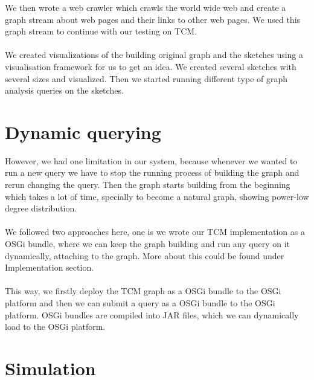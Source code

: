 \documentclass[12pt]{report}
\numberwithin{figure}{section}
\numberwithin{table}{section}
\begin{document}
We then wrote a web crawler which crawls the world wide web and create a graph stream about web pages and their links to other web pages. We used this graph stream to continue with our testing on TCM. 

\paragraph{}

We created visualizations of the building original graph and the sketches using a visualisation framework for us to get an idea. We created several sketches with several sizes and visualized. Then we started running different type of graph analysis queries on the sketches. 

\section{Dynamic querying}

However, we had one limitation in our system, because whenever we wanted to run a new query we have to stop the running process of building the graph and rerun changing the query. Then the graph starts building from the beginning which takes a lot of time, specially to become a  natural graph, showing power-low degree distribution. 

\paragraph{}

We followed two approaches here, one is we wrote our TCM implementation as a OSGi bundle, where we can keep the graph building and run any query on it dynamically, attaching to the graph. More about this could be found under Implementation section. 

\paragraph{}

This way, we firstly deploy the TCM graph as a OSGi bundle to the OSGi platform and then we can submit a query as a OSGi bundle to the OSGi platform. OSGi bundles are compiled into JAR files, which we can dynamically load to the OSGi platform. 

\section{Simulation}
\end{document}
